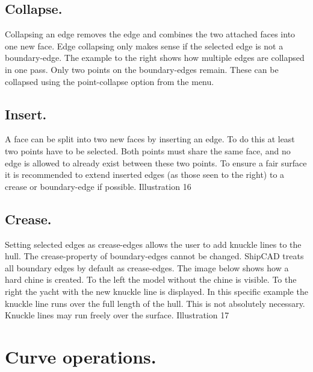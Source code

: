 \documentclass[12pt]{article}
\begin{document}
\subsection{Collapse.} \label{edge-collapse}
Collapsing an edge removes the edge and combines the two attached faces into one new face.
Edge collapsing only makes sense if the selected edge is not a boundary-edge. The example to the
right shows how multiple edges are collapsed in one pass. Only two points on the boundary-edges
remain. These can be collapsed using the point-collapse option from the menu.

\subsection{Insert.}
A face can be split into two new faces by
inserting an edge. To do this at least two points
have to be selected. Both points must share the
same face, and no edge is allowed to already
exist between these two points. To ensure a fair
surface it is recommended to extend inserted
edges (as those seen to the right) to a crease or
boundary-edge if possible.
Illustration 16

\subsection{Crease.}
Setting selected edges as crease-edges allows the user to add knuckle lines to the hull. The
crease-property of boundary-edges cannot be changed. ShipCAD treats all boundary edges by
default as crease-edges. The image below shows how a hard chine is created. To the left the model
without the chine is visible. To the right the yacht with the new knuckle line is displayed. In this
specific example the knuckle line runs over the full length of the hull. This is not absolutely
necessary. Knuckle lines may run freely over the surface.
Illustration 17

\section{Curve operations.}
\end{document}
